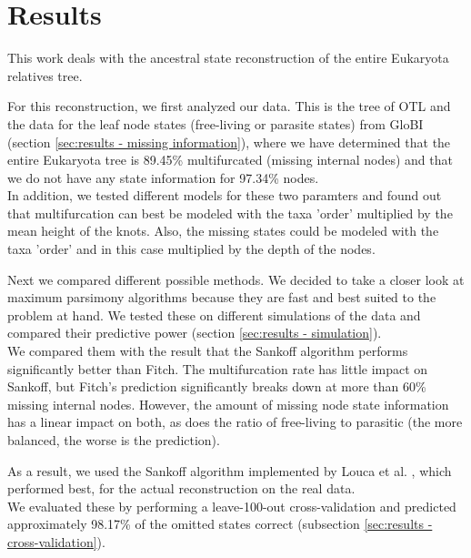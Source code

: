 \chapter{Results}
  This work deals with the ancestral state reconstruction of the entire Eukaryota relatives tree.

  For this reconstruction, we first analyzed our data. This is the tree of OTL \cite{Hinchliff2015}
    and the data for the leaf node states (free-living or parasite states) from GloBI 
    \cite{Poelen2014} (section \ref{sec:results - missing information}), where we have determined 
    that the entire Eukaryota tree is 89.45\% multifurcated (missing internal nodes) and that we do 
    not have any state information for 97.34\% nodes. \\
  In addition, we tested different models for these two paramters and found out that multifurcation 
    can best be modeled with the taxa 'order' multiplied by the mean height of the knots. Also, the 
    missing states could be modeled with the taxa 'order' and in this case multiplied by the depth 
    of the nodes.
  
  Next we compared different possible methods. We decided to take a closer look at maximum parsimony 
    algorithms because they are fast and best suited to the problem at hand. We tested these on 
    different simulations of the data and compared their predictive power (section 
    \ref{sec:results - simulation}). \\
  We compared them with the result that the Sankoff algorithm performs significantly better than 
    Fitch. The multifurcation rate has little impact on Sankoff, but Fitch's prediction 
    significantly breaks down at more than 60\% missing internal nodes. However, the amount of 
    missing node state information has a linear impact on both, as does the ratio of free-living to 
    parasitic (the more balanced, the worse is the prediction).

  As a result, we used the Sankoff algorithm \cite{Sankoff1975} implemented by Louca et al. 
    \cite{Louca2017}, which performed best, for the actual reconstruction on the real data. \\
  We evaluated these by performing a leave-100-out cross-validation and predicted approximately 
    98.17\% of the omitted states correct (subsection \ref{sec:results - cross-validation}). \\ 

